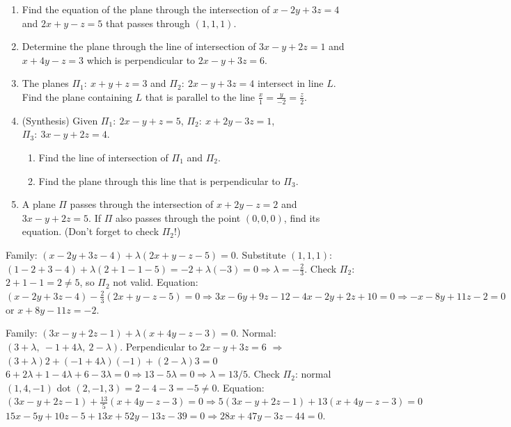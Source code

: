 \documentclass[11pt]{article}
\begin{document}
\begin{exercice}
\begin{enumerate}
\item Find the equation of the plane through the intersection of $x-2y+3z=4$ and $2x+y-z=5$ that passes through $(1,1,1)$.
\item Determine the plane through the line of intersection of $3x-y+2z=1$ and $x+4y-z=3$ which is perpendicular to $2x-y+3z=6$.
\item The planes $\Pi_1:\ x+y+z=3$ and $\Pi_2:\ 2x-y+3z=4$ intersect in line $L$. Find the plane containing $L$ that is parallel to the line $\frac{x}{1}=\frac{y}{-2}=\frac{z}{2}$.
\item (Synthesis) Given $\Pi_1:\ 2x-y+z=5$, $\Pi_2:\ x+2y-3z=1$, $\Pi_3:\ 3x-y+2z=4$.
  \begin{enumerate}
  \item Find the line of intersection of $\Pi_1$ and $\Pi_2$.
  \item Find the plane through this line that is perpendicular to $\Pi_3$.
  \end{enumerate}
\item A plane $\Pi$ passes through the intersection of $x+2y-z=2$ and $3x-y+2z=5$. If $\Pi$ also passes through the point $(0,0,0)$, find its equation. (Don't forget to check $\Pi_2$!)
\end{enumerate}
\end{exercice}

\begin{corrige}[Exercise 1]
Family: $(x-2y+3z-4)+\lambda(2x+y-z-5)=0$.
Substitute $(1,1,1)$: $(1-2+3-4)+\lambda(2+1-1-5)= -2+\lambda(-3)=0 \Rightarrow \lambda=-\frac{2}{3}$.
Check $\Pi_2$: $2+1-1=2\neq5$, so $\Pi_2$ not valid.
Equation: $(x-2y+3z-4)-\frac{2}{3}(2x+y-z-5)=0 \Rightarrow 3x-6y+9z-12-4x-2y+2z+10=0 \Rightarrow -x-8y+11z-2=0$ or $x+8y-11z=-2$.
\end{corrige}

\begin{corrige}[Exercise 2]
Family: $(3x-y+2z-1)+\lambda(x+4y-z-3)=0$.
Normal: $(3+\lambda,\ -1+4\lambda,\ 2-\lambda)$.
Perpendicular to $2x-y+3z=6$ $\Rightarrow$ $(3+\lambda)2+(-1+4\lambda)(-1)+(2-\lambda)3=0$
$6+2\lambda+1-4\lambda+6-3\lambda=0 \Rightarrow 13-5\lambda=0 \Rightarrow \lambda=13/5$.
Check $\Pi_2$: normal $(1,4,-1)$ dot $(2,-1,3)=2-4-3=-5\neq0$.
Equation: $(3x-y+2z-1)+\frac{13}{5}(x+4y-z-3)=0 \Rightarrow 5(3x-y+2z-1)+13(x+4y-z-3)=0$
$15x-5y+10z-5+13x+52y-13z-39=0 \Rightarrow 28x+47y-3z-44=0$.
\end{corrige}
\end{document}
